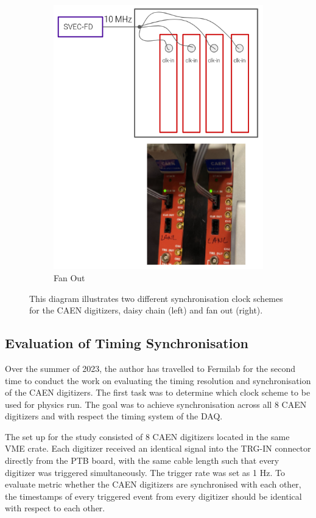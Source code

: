 \begin{figure}[htbp!]
\begin{subfigure}[h]{0.49\linewidth}
\includegraphics[width=\linewidth]{fanout}
\caption{Fan Out}
\end{subfigure}%
\caption[clockScheme]{
This diagram illustrates two different synchronisation clock schemes for the CAEN digitizers, daisy chain (left) and fan out (right).
}
\label{fig:clockScheme}
\end{figure}

\subsection{Evaluation of Timing Synchronisation}
\label{subsec42PMT}
Over the summer of 2023, the author has travelled to Fermilab for the second time to conduct the work on evaluating the timing resolution and synchronisation of the CAEN digitizers.
The first task was to determine which clock scheme to be used for physics run. 
The goal was to achieve synchronisation across all 8 CAEN digitizers and with respect the timing system of the DAQ.

The set up for the study consisted of 8 CAEN digitizers located in the same VME crate. 
Each digitizer received an identical signal into the TRG-IN connector directly from the PTB board, with the same cable length such that every digitizer was triggered simultaneously.
The trigger rate was set as 1 Hz.
To evaluate metric whether the CAEN digitizers are synchronised with each other, the timestamps of every triggered event from every digitizer should be identical with respect to each other. 

